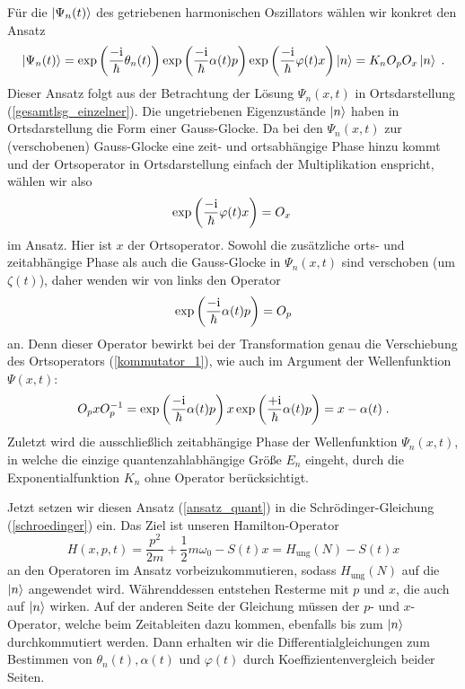   Für die $\ket{\Psi_n(t)}$ des getriebenen harmonischen Oszillators wählen wir konkret den Ansatz
  \begin{equation}
    \ket{\Psi_n(t)}=\exp\left(\frac{-\text i}{\hbar}\theta_n(t)\right)\exp\left(\frac{-\text i}{\hbar}\alpha(t)p\right)\exp\left(\frac{-\text i}{\hbar}\varphi(t)x\right)\ket{n}=K_nO_pO_x\ket{n} \;.
    \label{ansatz_quant}
  \end{equation}
  Dieser Ansatz folgt aus der Betrachtung der Lösung $\Psi_n(x,t)$ in Ortsdarstellung (\ref{gesamtlsg_einzelner}).
  Die ungetriebenen Eigenzustände $\ket{n}$ haben in Ortsdarstellung die Form einer Gauss-Glocke.
  Da bei den $\Psi_n(x,t)$ zur (verschobenen) Gauss-Glocke eine zeit- und ortsabhängige Phase hinzu kommt und der Ortsoperator in Ortsdarstellung einfach der Multiplikation enspricht, wählen wir also
  \begin{equation}
    \exp\left(\frac{-\text i}{\hbar}\varphi(t)x\right)=O_x \;
  \end{equation}
  im Ansatz.
  Hier ist $x$ der Ortsoperator.
  Sowohl die zusätzliche orts- und zeitabhängige Phase als auch die Gauss-Glocke in $\Psi_n(x,t)$ sind verschoben (um $\zeta(t)$), daher wenden wir von links den Operator
  \begin{equation}
    \exp\left(\frac{-\text i}{\hbar}\alpha(t)p\right)=O_p
  \end{equation}
  an.
  Denn dieser Operator bewirkt bei der Transformation genau die Verschiebung des Ortsoperators (\ref{kommutator_1}), wie auch im Argument der Wellenfunktion $\Psi(x,t)$:
  \begin{equation}
    O_pxO_p^{-1}=
    \exp\left(\frac{-\text i}{\hbar}\alpha(t)p\right) x  \exp\left(\frac{+\text i}{\hbar}\alpha(t)p\right)
    =x-\alpha(t) \; .
    \label{verschiebung_x}
  \end{equation}
  Zuletzt wird die ausschließlich zeitabhängige Phase der Wellenfunktion $\Psi_n(x,t)$, in welche die einzige quantenzahlabhängige Größe $E_n$ eingeht, durch die Exponentialfunktion $K_n$ ohne Operator berücksichtigt.

  Jetzt setzen wir diesen Ansatz (\ref{ansatz_quant}) in die Schrödinger-Gleichung (\ref{schroedinger}) ein.
  Das Ziel ist unseren Hamilton-Operator
  \begin{equation}
    H(x,p,t)=\frac{p^2}{2m}+\frac 1 2 m\omega_0 -S(t)x = H_{\text{ung}}(N)-S(t)x
  \end{equation}
  an den Operatoren im Ansatz vorbeizukommutieren, sodass $H_{\text{ung}}(N)$ auf die $\ket{n}$ angewendet wird.
  Währenddessen entstehen Resterme mit $p$ und $x$, die auch auf $\ket{n}$ wirken.
  Auf der anderen Seite der Gleichung müssen der $p$- und $x$-Operator, welche beim Zeitableiten dazu kommen, ebenfalls bis zum $\ket{n}$ durchkommutiert werden.
  Dann erhalten wir die Differentialgleichungen zum Bestimmen von $\theta_n(t), \alpha(t)$ und $\varphi(t)$ durch Koeffizientenvergleich beider Seiten.

